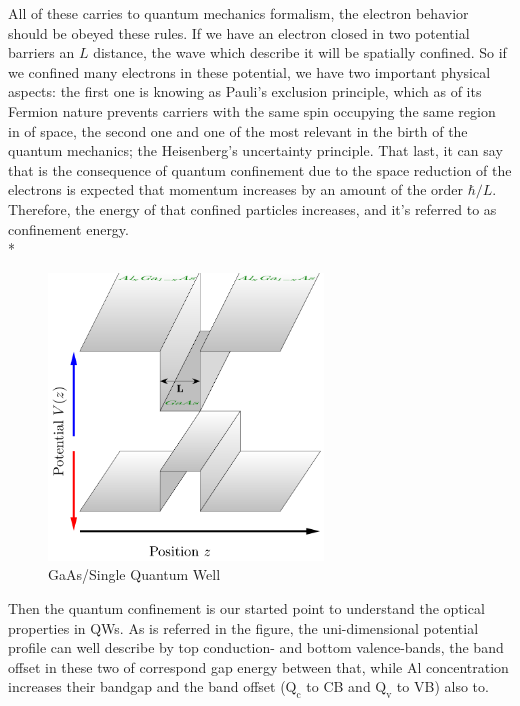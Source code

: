 All of these carries to quantum mechanics formalism, the electron behavior should be obeyed these rules. If we have an electron closed in two potential barriers  an $L$ distance, the wave which describe it will be spatially confined.
So if we confined many electrons in these potential,  we have two important physical aspects: the first one is knowing as Pauli's exclusion principle, which as of its Fermion nature prevents carriers with the same spin occupying the same region in of space\cite{harrison2016quantum,pauli1925zusammenhang}, the second one and one of the most relevant in the birth of the quantum mechanics; the Heisenberg's uncertainty principle. 
That last, it can say  that is the consequence of quantum confinement due to the space reduction of the electrons is expected that momentum increases by an amount of the order $\hbar/L$. Therefore, the energy of that confined particles increases, and it's referred to as confinement energy\cite{cardona2005fundamentals}. \\*
\begin{figure}
	\centering
	\includegraphics[width=0.65\textwidth]{../figures/chapter-1/heterostructures/out-ruco/qw1}
	\caption{GaAs/\algaas Single Quantum Well }
	\label{fig:subsection-1.2-single-quantum-well-scheme}
\end{figure}
Then the quantum confinement is our started point to understand the optical properties in QWs. As is referred in the figure, the uni-dimensional potential profile can well describe by top conduction- and bottom valence-bands, the band offset in these two of correspond gap energy between that, while Al concentration increases their bandgap and the band offset ($\mathrm{Q_{c}}$ to CB and $\mathrm{Q_{v}}$ to VB) also to.   

